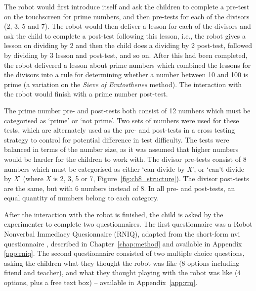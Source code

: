 The robot would first introduce itself and ask the children to complete a pre-test on the touchscreen for prime numbers, and then pre-tests for each of the divisors (2, 3, 5 and 7). The robot would then deliver a lesson for each of the divisors and ask the child to complete a post-test following this lesson, i.e., the robot gives a lesson on dividing by 2 and then the child does a dividing by 2 post-test, followed by dividing by 3 lesson and post-test, and so on. After this had been completed, the robot delivered a lesson about prime numbers which combined the lessons for the divisors into a rule for determining whether a number between 10 and 100 is prime (a variation on the \textit{Sieve of Eratosthenes} method). The interaction with the robot would finish with a prime number post-test.

The prime number pre- and post-tests both consist of 12 numbers which must be categorised as `prime' or `not prime'. Two sets of numbers were used for these tests, which are alternately used as the pre- and post-tests in a cross testing strategy to control for potential difference in test difficulty. The tests were balanced in terms of the number size, as it was assumed that higher numbers would be harder for the children to work with. The divisor pre-tests consist of 8 numbers which must be categorised as either `can divide by \textit{X}', or `can't divide by \textit{X}' (where \textit{X} is 2, 3, 5 or 7, Figure~\ref{fig:ch8_structure}). The divisor post-tests are the same, but with 6 numbers instead of 8. In all pre- and post-tests, an equal quantity of numbers belong to each category.

After the interaction with the robot is finished, the child is asked by the experimenter to complete two questionnaires. The first questionnaire was a Robot Nonverbal Immediacy Quesionnaire (RNIQ), adapted from the short-form \acrshort{nvi} questionnaire \citep{richmond1998nonverbal}, described in Chapter~\ref{chap:method} and available in Appendix \ref{app:rniq}. The second questionnaire consisted of two multiple choice questions, asking the children what they thought the robot was like (8 options including friend and teacher), and what they thought playing with the robot was like (4 options, plus a free text box) -- available in Appendix~\ref{app:rrq}.

